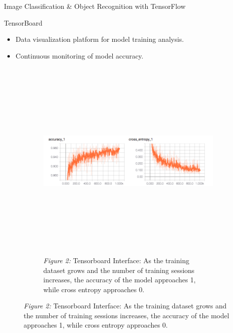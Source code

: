 \documentclass[22pt]{beamer}
\begin{document}
\begin{frame}[fragile]
\begin{textblock}{7.25}
\begin{block}{Image Classification & Object Recognition with TensorFlow}
\begin{figure}[htbp]
\begin{subfigure}{0.95\textwidth}
   \label{fig:softmax}
\end{subfigure}
\end{figure}
TensorBoard
\begin{itemize}
\item Data visualization platform for model training analysis.
\item Continuous monitoring of model accuracy.
\end{itemize}
\begin{figure}[htbp] %
\begin{subfigure}{0.95\textwidth}
   \centering
   \includegraphics[height=10cm]{interface.png}
   \caption*{\textit{Figure 2:} Tensorboard Interface:  As the training dataset grows and the number of training sessions increases, the accuracy of the model approaches 1, while cross entropy approaches 0.}
   \label{fig:interface}
\end{subfigure}
\end{figure}
\end{block}
\end{textblock}


\end{frame}
\end{document}
